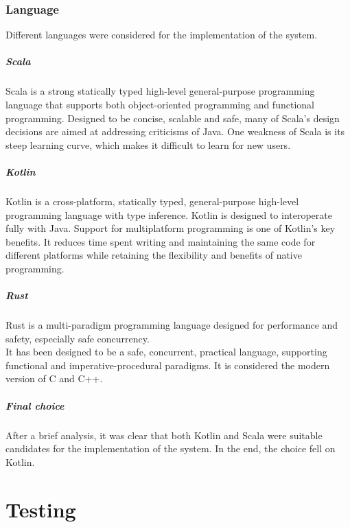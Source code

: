 \documentclass[12pt,a4paper,openright,twoside]{book}
\begin{document}
\subsection*{Language}
Different languages were considered for the implementation of the system.

\paragraph*{Scala}
Scala is a strong statically typed high-level general-purpose programming language that supports both object-oriented
programming and functional programming.
Designed to be concise, scalable and safe, many of Scala's design decisions are aimed at addressing criticisms of Java.
One weakness of Scala is its steep learning curve, which makes it difficult to learn for new users.

\paragraph*{Kotlin}
Kotlin is a cross-platform, statically typed, general-purpose high-level programming language with type inference.
Kotlin is designed to interoperate fully with Java.
Support for multiplatform programming is one of Kotlin’s key benefits. It reduces time spent writing and maintaining
the same code for different platforms while retaining the flexibility and benefits of native programming.


\paragraph*{Rust}

Rust is a multi-paradigm programming language designed for performance and safety, especially safe concurrency. \\
It has been designed to be a safe, concurrent, practical language, supporting functional and imperative-procedural paradigms.
It is considered the modern version of C and C++.

\paragraph*{Final choice}
After a brief analysis, it was clear that both Kotlin and Scala were suitable candidates for the implementation of the system.
In the end, the choice fell on Kotlin.

\chapter{Testing}
\end{document}
